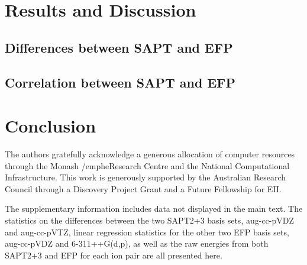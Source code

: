 \documentclass[journal=jctcce]{achemso}
\begin{document}
\section{Results and Discussion}
\label{sec:results}



\subsection{Differences between SAPT and EFP}
\label{subsec:comparison}


\subsection{Correlation between SAPT and EFP}
\label{subsec:corr-elst}



%
\section{Conclusion}
\label{sec:conclusion}


\begin{acknowledgement}
The authors gratefully acknowledge a generous allocation of computer resources through the Monash /emph{e}Research
Centre and the National Computational Infrastructure. This
work is generously supported by the Australian Research Council through a Discovery Project Grant and a Future Fellowship for EII.
\end{acknowledgement}

\begin{suppinfo}
    The supplementary information includes data not displayed in the main text.
    The statistics on the differences between the two SAPT2+3 basis sets, aug-cc-pVDZ and aug-cc-pVTZ, linear regression statistics for the other two EFP basis sets, aug-cc-pVDZ and 6-311++G(d,p), as well as the raw energies from both SAPT2+3 and EFP for each ion pair are all presented here.
\end{suppinfo}

%

%



\clearpage



%
%
%
%
%
\end{document}
